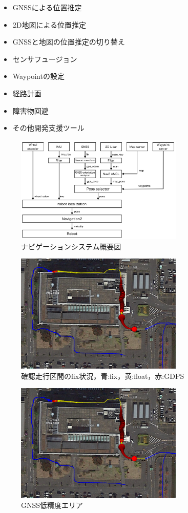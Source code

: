 \documentclass[platex,dvipdfmx]{rbproceedings}
\begin{document}
\begin{itemize}
    \item GNSSによる位置推定
    \item 2D地図による位置推定
    \item GNSSと地図の位置推定の切り替え
    \item センサフュージョン
    \item Waypointの設定
    \item 経路計画
    \item 障害物回避
    \item その他開発支援ツール
\end{itemize}

\begin{figure}[htbp]
    \centering   
    \includegraphics[keepaspectratio,width=80mm]{fig/system.png}
    \caption{ナビゲーションシステム概要図}
    \label{fig:system}
\end{figure}

\begin{figure}[htbp]
    \centering   
    \includegraphics[keepaspectratio,width=80mm]{fig/cityhall_fix.png}
    \caption{確認走行区間のfix状況，青:fix，黄:float，赤:GDPS}
    \label{fig:cityhall_fix}
\end{figure}

\begin{figure}[htbp]
    \centering   
    \includegraphics[keepaspectratio,width=80mm]{fig/cityhall_fix.png}
    \caption{GNSS低精度エリア}
    \label{fig:no_gnss_area}
\end{figure}
\end{document}
